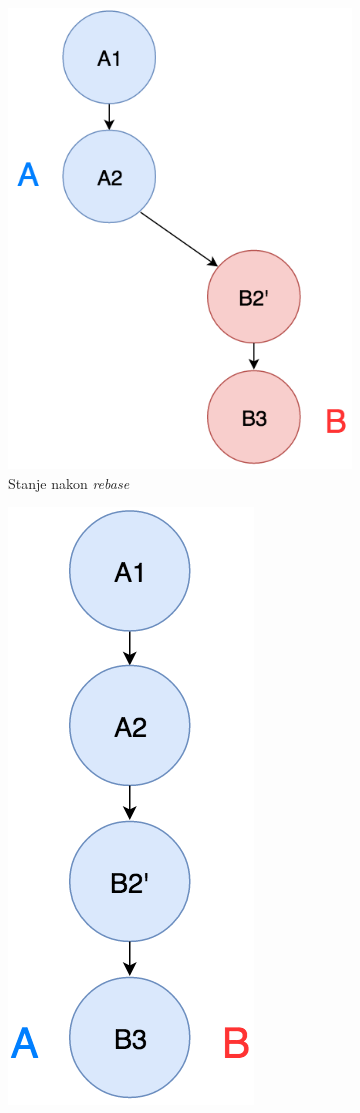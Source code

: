 \documentclass[times, utf8, diplomski, numeric]{fer}
\begin{document}
\begin{figure}[h!]
\begin{subfigure}{.3\textwidth}
\centering
\includegraphics[scale=0.5]{RebaseB}
\caption{Stanje nakon \textit{rebase}}
\label{fig:RebaseB}
\end{subfigure}
\begin{subfigure}{.3\textwidth}
\centering
\includegraphics[scale=0.5]{RebaseC}

\end{subfigure}
\end{figure}
\end{document}
